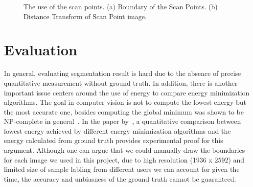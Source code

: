 \documentclass{article} %
\begin{document}
\begin{figure}[h]
\begin{center}
\end{center}
\caption{The use of the scan points. (a) Boundary of the Scan
  Points. (b) Distance Transform of Scan Point image.}
\label{fig:data_usage}
\end{figure}

\section{Evaluation}
\label{sec:exp}


In general, evaluating segmentation result is hard due to the absence
of precise quantitative measurement without ground truth. In addition,
there is another important issue centers around the use of energy to
compare energy minimization algorithms. The goal in computer vision is
not to compute the lowest energy but the most accurate one, besides
computing the global minimum was shown to be NP-complete in
general~\citep{Boykov2001Fast}. In the paper
by~\citet{Szeliski2008Comparative}, a quantitative comparison between
lowest energy achieved by different energy minimization algorithms and
the energy calculated from ground truth provides experimental proof
for this argument. Although one can argue that we could manually draw
the boundaries for each image we used in this project, due to high
resolution (1936 x 2592) and limited size of sample labling from
different users we can account for given the time, the accuracy and
unbiasness of the ground truth cannot be guaranteed.
\end{document}
